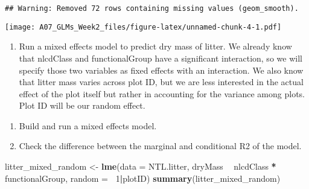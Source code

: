 \documentclass[]{article}
\newenvironment{Shaded}{\begin{snugshade}}{\end{snugshade}}
\newcommand{\DataTypeTok}[1]{\textcolor[rgb]{0.13,0.29,0.53}{#1}}
\newcommand{\DecValTok}[1]{\textcolor[rgb]{0.00,0.00,0.81}{#1}}
\newcommand{\KeywordTok}[1]{\textcolor[rgb]{0.13,0.29,0.53}{\textbf{#1}}}
\newcommand{\NormalTok}[1]{#1}
\newcommand{\OperatorTok}[1]{\textcolor[rgb]{0.81,0.36,0.00}{\textbf{#1}}}
\newcommand{\StringTok}[1]{\textcolor[rgb]{0.31,0.60,0.02}{#1}}
\providecommand{\tightlist}{%
  \setlength{\itemsep}{0pt}\setlength{\parskip}{0pt}}
\begin{document}
\begin{verbatim}
## Warning: Removed 72 rows containing missing values (geom_smooth).
\end{verbatim}

\texttt{[image: A07\_GLMs\_Week2\_files/figure-latex/unnamed-chunk-4-1.pdf]}

\begin{enumerate}
\def\labelenumi{\arabic{enumi}.}
\setcounter{enumi}{8}
\tightlist
\item
  Run a mixed effects model to predict dry mass of litter. We already
  know that nlcdClass and functionalGroup have a significant
  interaction, so we will specify those two variables as fixed effects
  with an interaction. We also know that litter mass varies across plot
  ID, but we are less interested in the actual effect of the plot itself
  but rather in accounting for the variance among plots. Plot ID will be
  our random effect.
\end{enumerate}

\begin{enumerate}
\def\labelenumi{\alph{enumi}.}
\tightlist
\item
  Build and run a mixed effects model.
\item
  Check the difference between the marginal and conditional R2 of the
  model.
\end{enumerate}

\begin{Shaded}
\begin{Highlighting}[]
\NormalTok{litter_mixed_random <-}\StringTok{ }\KeywordTok{lme}\NormalTok{(}\DataTypeTok{data =}\NormalTok{ NTL.litter,}
\NormalTok{                    dryMass }\OperatorTok{~}\StringTok{ }\NormalTok{nlcdClass }\OperatorTok{*}\StringTok{ }\NormalTok{functionalGroup,}
                    \DataTypeTok{random =} \OperatorTok{~}\DecValTok{1}\OperatorTok{|}\NormalTok{plotID)}
\KeywordTok{summary}\NormalTok{(litter_mixed_random)}
\end{Highlighting}
\end{Shaded}
\end{document}
